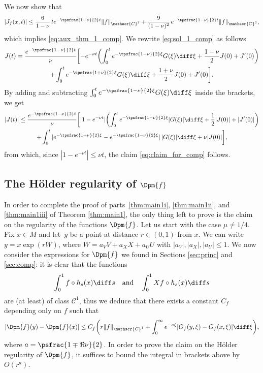 We now show that
\begin{equation}\label{eq:claim_for_comp}
|J_f(x,t)|\leq \frac{6}{1-\nu}\, t e^{-\tpsfrac{1-\nu}{2}t} \|f\|_{\mathscr{C}^2} + \frac{9}{(1-\nu)^2}\, e^{-\tpsfrac{1-\nu}{2}t} \|f\|_{\mathscr{C}^2},
\end{equation}
which implies \eqref{eq:aux_thm_1_comp}.
We rewrite \eqref{eq:sol_1_comp} as follows
\begin{multline*}
J(t) = \frac{e^{-\tpsfrac{1-\nu}{2}t}}{\nu} \biggl[- e^{-\nu t} \biggl(\int_0^t e^{-\tpsfrac{1-\nu}{2}\xi} G(\xi) \diff \xi + \frac{1-\nu}{2} J(0)+J'(0) \biggr) \\
+ \int_0^t e^{-\tpsfrac{1+\nu}{2}\xi} G(\xi) \diff \xi + \frac{1+\nu}{2} J(0) + J'(0) \biggr].
\end{multline*}
By adding and subtracting $\int_0^t e^{-\tpsfrac{1-\nu}{2}\xi} G(\xi) \diff \xi$ inside the brackets, we get
\begin{multline*}
|J(t)|\leq \frac{e^{-\tpsfrac{1-\nu}{2}t}}{\nu} \biggl[|1 - e^{-\nu t}|\biggl(\int_0^t e^{-\tpsfrac{1-\nu}{2}\xi} |G(\xi)|\diff \xi + \frac{1}{2} |J(0)|+|J'(0)|\biggr) \\
+ \int_0^t |e^{-\tpsfrac{1+\nu}{2}\xi} - e^{-\tpsfrac{1-\nu}{2}\xi}|\, |G(\xi)|\diff \xi + \nu |J(0)|\biggr],
\end{multline*}
from which, since $|1-e^{-\nu t}|\leq \nu t$, the claim \eqref{eq:claim_for_comp} follows.


\subsection{The Hölder regularity of $\Dpm{f}$}

In order to complete the proof of parts~\eqref{thm:main1i}, \eqref{thm:main1ii}, and \eqref{thm:main1iii} of Theorem \ref{thm:main1}, the only thing left to prove is the claim on the regularity of the functions $\Dpm{f}$.
Let us start with the case $\mu \neq 1/4$.
Fix $x \in M$ and let~$y$ be a point at distance $r \in (0,1)$ from $x$. We can write $y = x \exp(rW)$, where \hbox{$W = a_VV+a_XX+a_UU$} with $|a_V|, |a_X|, |a_U|\leq 1$.
We now consider the expressions for $\Dpm{f}$ we found in Sections \ref{sec:princ} and \ref{sec:comp}:
it is clear that the functions
\[
\int_0^1 f \circ h_s(x) \diff s \quad\text{and}\quad \int_0^1 Xf \circ h_s(x) \diff s
\]
are (at least) of class $\mathscr{C}^1$, thus we deduce that there exists a constant $C_f$ depending only on $f$ such that
\[
|\Dpm{f}(y) - \Dpm{f}(x)|\leq C_{f} \biggl(r \|f\|_{\mathscr{C}^1} + \int_0^{\infty} e^{-a \xi} |G_{f}(y,\xi) -G_{f}(x,\xi) |\diff \xi \biggr),
\]
where $a = \psfrac{1\mp \Re \nu}{2}$.
In order to prove the claim on the Hölder regularity of $\Dpm{f}$, it suffices to bound the integral in brackets above by $O(r^a)$.

